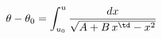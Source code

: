 \begin{equation}
\theta - \theta_0 = \int_{u_{0}}^u  \frac{dx}{\sqrt{A + B \, x^\td
- x^2}} \label{teta}
\end{equation}

